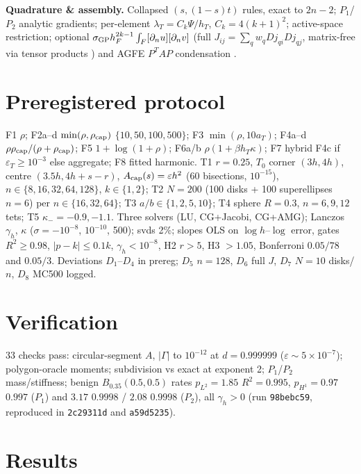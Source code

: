 \documentclass[11pt]{article}
\theoremstyle{definition}
\begin{document}
\textbf{Quadrature \& assembly.} Collapsed $(s,(1-s)t)$ rules, exact to
$2n-2$; $P_1$/$P_2$ analytic gradients; per-element
$\lambda_T=C_k\Psi/h_T$, $C_k=4(k+1)^2$; active-space restriction; optional
$\sigma_{\rm GP}h_F^{2k-1}\int_F[\partial_nu][\partial_nv]$ (full
$J_{ij}=\sum_qw_qDj_{qi}Dj_{qj}$, matrix-free via tensor products
\citep{wengrowski2025matrix}) and AGFE $P^TAP$ condensation
\citep{badia2019aggregated}.

\section{Preregistered protocol}\label{sec:protocol}
F1 $\rho$; F2a--d $\min(\rho,\rho_{\rm cap})$ $\{10,50,100,500\}$;
F3 $\min(\rho,10a_T)$; F4a--d $\rho\rho_{\rm cap}/(\rho+\rho_{\rm cap})$;
F5 $1+\log(1+\rho)$; F6a/b $\rho(1+\beta h_T\kappa)$;
F7 hybrid F4c if $\varepsilon_T\ge10^{-3}$ else aggregate;
F8 fitted harmonic. T1 $r=0.25$, $T_0$ corner $(3h,4h)$,
centre $(3.5h,4h+s-r)$, $A_{\rm cap}(s)=\varepsilon h^2$ (60 bisections,
$10^{-15}$), $n\in\{8,16,32,64,128\}$, $k\in\{1,2\}$; T2 $N=200$
(100 disks + 100 superellipses $n=6$) per $n\in\{16,32,64\}$; T3
$a/b\in\{1,2,5,10\}$; T4 sphere $R=0.3$, $n=6,9,12$ tets; T5
$\kappa_-=-0.9,-1.1$. Three solvers (LU, CG+Jacobi, CG+AMG); Lanczos
$\gamma_h$, $\kappa$ ($\sigma=-10^{-8}$, $10^{-10}$, 500); svds 2\%;
slopes OLS on $\log h$--$\log$ error, gates $R^2\ge0.98$,
$|p-k|\le0.1k$, $\gamma_h<10^{-8}$, H2 $r>5$, H3 $>1.05$, Bonferroni
$0.05/78$ and $0.05/3$. Deviations $D_1$--$D_4$ in prereg; $D_5$ $n=128$,
$D_6$ full $J$, $D_7$ $N=10$ disks/$n$, $D_8$ MC500 logged.

\section{Verification}
33 checks pass: circular-segment $A$, $|\Gamma|$ to $10^{-12}$ at
$d=0.999999$ ($\varepsilon\sim5\times10^{-7}$); polygon-oracle moments;
subdivision vs exact at exponent 2; $P_1$/$P_2$ mass/stiffness; benign
$B_{0.35}(0.5,0.5)$ rates $p_{L^2}=1.85$ $R^2=0.995$, $p_{H^1}=0.97$ $0.997$
($P_1$) and $3.17$ $0.9998$ / $2.08$ $0.9998$ ($P_2$), all $\gamma_h>0$ (run
\texttt{98bebc59}, reproduced in \texttt{2c29311d} and \texttt{a59d5235}).

\section{Results}\label{sec:results}
\end{document}
